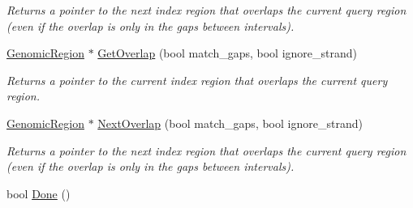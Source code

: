 \begin{CompactItemize}
\begin{CompactList}\small\item\em Returns a pointer to the next index region that overlaps the current query region (even if the overlap is only in the gaps between intervals). \item\end{CompactList}\item 
\hyperlink{classGenomicRegion}{GenomicRegion} $\ast$ \hyperlink{classGenomicRegionSetOverlapScanner_63d7837172475b7c75d1b5b28a4bca97}{GetOverlap} (bool match\_\-gaps, bool ignore\_\-strand)
\begin{CompactList}\small\item\em Returns a pointer to the current index region that overlaps the current query region. \item\end{CompactList}\item 
\hyperlink{classGenomicRegion}{GenomicRegion} $\ast$ \hyperlink{classGenomicRegionSetOverlapScanner_3358b5f338f92581b2e47f8e8ec9b0ef}{NextOverlap} (bool match\_\-gaps, bool ignore\_\-strand)
\begin{CompactList}\small\item\em Returns a pointer to the next index region that overlaps the current query region (even if the overlap is only in the gaps between intervals). \item\end{CompactList}\item 
\hypertarget{classGenomicRegionSetOverlapScanner_78c2866a7a33facc94aaa21513ae31cf}{
bool \hyperlink{classGenomicRegionSetOverlapScanner_78c2866a7a33facc94aaa21513ae31cf}{Done} ()}
\label{classGenomicRegionSetOverlapScanner_78c2866a7a33facc94aaa21513ae31cf}


\end{CompactItemize}
